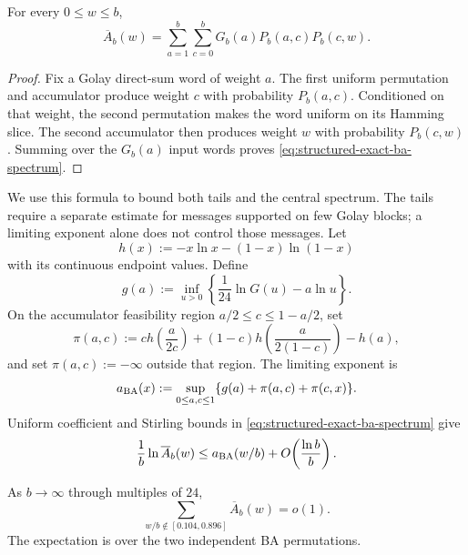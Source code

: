 \begin{lemma}
\label{lem:structured-exact-ba-spectrum}
For every $0\le w\le b$,
\begin{equation}
  \overline A_b(w)
  =
  \sum_{a=1}^b\sum_{c=0}^b
  G_b(a)P_b(a,c)P_b(c,w).
  \label{eq:structured-exact-ba-spectrum}
\end{equation}
\end{lemma}

\begin{proof}
Fix a Golay direct-sum word of weight $a$. The first uniform permutation and
accumulator produce weight $c$ with probability $P_b(a,c)$. Conditioned on
that weight, the second permutation makes the word uniform on its Hamming
slice. The second accumulator then produces weight $w$ with probability
$P_b(c,w)$. Summing over the $G_b(a)$ input words proves
\eqref{eq:structured-exact-ba-spectrum}.
\end{proof}

We use this formula to bound both tails and the central spectrum.
The tails require a separate estimate for messages supported on few Golay
blocks; a limiting exponent alone does not control those messages. Let
\[
  h(x):=-x\ln x-(1-x)\ln(1-x)
\]
with its continuous endpoint values. Define
\[
  g(a)
  :=
  \inf_{u>0}\left\{\frac1{24}\ln G(u)-a\ln u\right\}.
\]
On the accumulator feasibility region $a/2\le c\le1-a/2$, set
\[
  \pi(a,c)
  :=
  c h\!\left(\frac{a}{2c}\right)
  +(1-c)h\!\left(\frac{a}{2(1-c)}\right)-h(a),
\]
and set $\pi(a,c):=-\infty$ outside that region. The limiting exponent is
\begin{equation}
  a_{\rm BA}(x)
  :=
  \sup_{0\le a,c\le1}
  \{g(a)+\pi(a,c)+\pi(c,x)\}.
  \label{eq:structured-ba-variational}
\end{equation}
Uniform coefficient and Stirling bounds in
\eqref{eq:structured-exact-ba-spectrum} give
\begin{equation}
  \frac1b\ln\overline A_b(w)
  \le
  a_{\rm BA}(w/b)
  +O\!\left(\frac{\ln b}{b}\right).
  \label{eq:structured-ba-asymptotic}
\end{equation}

\begin{lemma}
\label{lem:structured-ba-tails}
As $b\to\infty$ through multiples of $24$,
\[
  \sum_{w/b\notin[0.104,0.896]}\overline A_b(w)=o(1).
\]
The expectation is over the two independent BA permutations.
\end{lemma}

